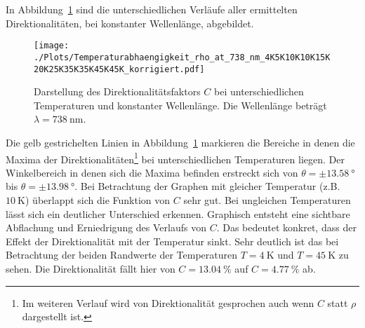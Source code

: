 In Abbildung~\ref{fig:temp_all_nach} sind die unterschiedlichen Verläufe
aller ermittelten Direktionalitäten, bei konstanter Wellenlänge, abgebildet.
\begin{figure}
    \centering
    \texttt{[image: ./Plots/Temperaturabhaengigkeit\_rho\_at\_738\_nm\_4K5K10K10K15K20K25K35K35K45K45K\_korrigiert.pdf]}
    \caption{Darstellung des Direktionalitätsfaktors $C$ bei unterschiedlichen Temperaturen und konstanter Wellenlänge.
    Die Wellenlänge beträgt $\lambda =\SI{738}{\nano\meter}$.}
    \label{fig:temp_all_nach}
\end{figure}
\FloatBarrier

Die gelb gestrichelten Linien in Abbildung~\ref{fig:temp_all_nach} markieren die Bereiche 
in denen die Maxima der Direktionalitäten\footnote{Im weiteren Verlauf wird
von Direktionalität gesprochen auch wenn $C$ statt $\rho$ dargestellt ist.} 
bei unterschiedlichen Temperaturen liegen.
Der Winkelbereich in denen sich die Maxima befinden erstreckt sich von  $\theta = \pm \SI{13,58}{\degree} 
$ bis $ \theta = \pm \SI{13,98}{\degree}$.
Bei Betrachtung der Graphen mit gleicher Temperatur (z.B. $\SI{10}{\kelvin}$) 
überlappt sich die Funktion von $C$ sehr gut.
Bei ungleichen Temperaturen lässt sich ein deutlicher Unterschied erkennen.
Graphisch entsteht eine sichtbare Abflachung und Erniedrigung des Verlaufs von $C$.
Das bedeutet konkret, dass der Effekt der Direktionalität mit der Temperatur sinkt.
Sehr deutlich ist das bei Betrachtung der beiden Randwerte 
der Temperaturen $T = \SI{4}{\kelvin}$ und $ T = \SI{45}{\kelvin}$ zu sehen.
Die Direktionalität fällt hier von $C= \SI{13.04}{\percent}$ auf $C = \SI{4,77}{\percent}$ ab.

